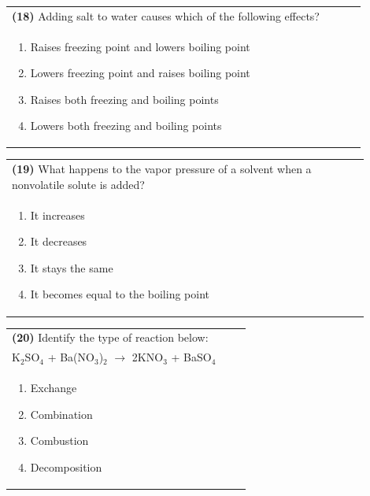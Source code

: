\documentclass{article}
\begin{document}
\noindent\begin{tabular}{|p{0.9\linewidth}|}
\hline
\textbf{(18)} Adding salt to water causes which of the following effects?\\[0.2cm]
\begin{minipage}[t]{0.85\linewidth}
\begin{enumerate}[label=\alph*.]
\item Raises freezing point and lowers boiling point
\item Lowers freezing point and raises boiling point
\item Raises both freezing and boiling points
\item Lowers both freezing and boiling points
\end{enumerate}
\end{minipage}\\[0.2cm]
\hline
\end{tabular}

\noindent\begin{tabular}{|p{0.9\linewidth}|}
\hline
\textbf{(19)} What happens to the vapor pressure of a solvent when a nonvolatile solute is added?\\[0.2cm]
\begin{minipage}[t]{0.85\linewidth}
\begin{enumerate}[label=\alph*.]
\item It increases
\item It decreases
\item It stays the same
\item It becomes equal to the boiling point
\end{enumerate}
\end{minipage}\\[0.2cm]
\hline
\end{tabular}

\noindent\begin{tabular}{|p{0.9\linewidth}|}
\hline
\textbf{(20)} Identify the type of reaction below:\\[0.2cm]
K$_2$SO$_4$ + Ba(NO$_3$)$_2$ $\rightarrow$ 2KNO$_3$ + BaSO$_4$\\[0.2cm]
\begin{minipage}[t]{0.85\linewidth}
\begin{enumerate}[label=\alph*.]
\item Exchange
\item Combination
\item Combustion
\item Decomposition
\end{enumerate}
\end{minipage}\\[0.2cm]
\hline
\end{tabular}
\newpage
\end{document}
